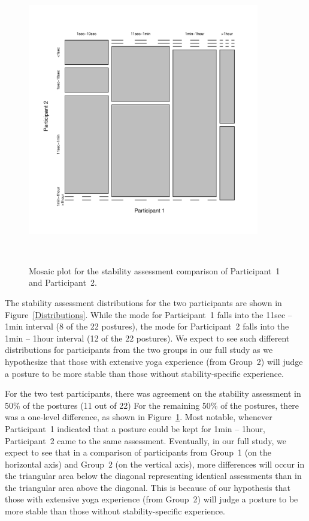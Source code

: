 \documentclass[11pt]{asaproc}
\begin{document}
\begin{figure}[t]
\begin{center} 
\includegraphics[width=0.9\textwidth]{figures/LengthsAgreements.pdf}
\end{center} ~\\[-2.5cm]
\caption{\label{Comparison}Mosaic plot for the stability assessment comparison of Participant~1 and Participant~2.}
\end{figure}


The stability assessment distributions for the two participants are shown in Figure~\ref{Distributions}.
While the mode for Participant~1 falls into the 11sec -- 1min interval (8 of the 22 postures),
the mode for Participant~2 falls into the 1min -- 1hour interval (12 of the 22 postures).
We expect to see such different distributions for participants from the two groups
in our full study as we hypothesize that 
those with extensive yoga experience (from Group~2) will judge a posture to be more stable than those 
without stability-specific experience.


For the two test participants, there was 
agreement on the stability assessment in 50\% of the postures (11 out of 22)
For the remaining 50\% of the postures, there was a one-level difference,
as shown in Figure~\ref{Comparison}. Most notable, whenever
Participant~1 indicated that a posture could be kept for 1min -- 1hour,
Participant~2 came to the same assessment.
Eventually, in our full study, we expect to see that in a comparison of
participants from Group~1 (on the horizontal axis) and Group~2 (on the vertical axis), more differences will occur
in the triangular area below the diagonal representing identical assessments
than in the triangular area above the diagonal. 
This is because of our hypothesis that
those with extensive yoga experience (from Group~2) will judge a posture to be more stable than those 
without stability-specific experience.
\end{document}

